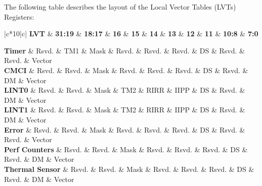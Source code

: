 \documentclass{article}
\newcommand{\layout}[1]{\parbox{\linewidth}{#1}}
\begin{document}
\cite[Chapter~12.4.1]{sdm3} \bigskip

\layout{
  The following table describes the layout of the Local Vector Tables (LVTs) Registers:
  \begin{table}[H]
    \centering
    \begin{tabular}{|c*{10}{|c}|}
      \hline \textbf{LVT} & \textbf{31:19} & \textbf{18:17} & \textbf{16} & \textbf{15} & \textbf{14} & \textbf{13} & \textbf{12} & \textbf{11} & \textbf{10:8} & \textbf{7:0} \\ \hline

      \textbf{Timer} & Rsvd. & TM1 & Mask & Rsvd. & Rsvd. & Rsvd. & DS & Rsvd. & Rsvd. & Vector \\
      \textbf{CMCI} & Rsvd. & Rsvd. & Mask & Rsvd. & Rsvd. & Rsvd. & DS & Rsvd. & DM & Vector \\
      \textbf{LINT0} & Rsvd. & Rsvd. & Mask & TM2 & RIRR & IIPP & DS & Rsvd. & DM & Vector \\
      \textbf{LINT1} & Rsvd. & Rsvd. & Mask & TM2 & RIRR & IIPP & DS & Rsvd. & DM & Vector \\
      \textbf{Error} & Rsvd. & Rsvd. & Mask & Rsvd. & Rsvd. & Rsvd. & DS & Rsvd. & Rsvd. & Vector \\
      \textbf{Perf Counters} & Rsvd. & Rsvd. & Mask & Rsvd. & Rsvd. & Rsvd. & DS & Rsvd. & DM & Vector \\
      \textbf{Thermal Sensor} & Rsvd. & Rsvd. & Mask & Rsvd. & Rsvd. & Rsvd. & DS & Rsvd. & DM & Vector \\ \hline
    \end{tabular}
  \end{table}
}
\end{document}
